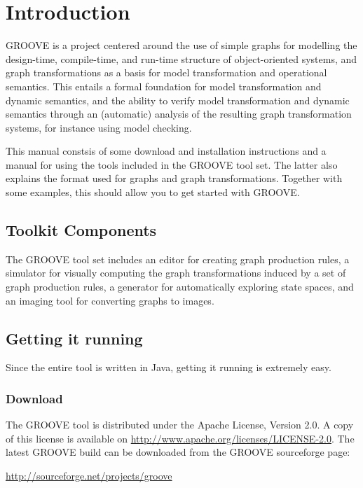 \section{Introduction}

GROOVE is a project centered around the use of simple graphs for
modelling the design-time, compile-time, and run-time structure of
object-oriented systems, and graph transformations as a basis for
model transformation and operational semantics. This entails a formal
foundation for  model transformation and dynamic semantics, and the
ability to verify model transformation and dynamic semantics through
an (automatic) analysis of the resulting graph transformation systems,
for instance using model checking.

This manual constsis of some download and installation instructions and a
manual for using the tools included in the GROOVE tool set. The latter also
explains the format used for graphs and graph transformations. Together
with some examples, this should allow you to get started with GROOVE.

\subsection{Toolkit Components}

The GROOVE tool set includes an editor for creating graph production
rules, a simulator for visually computing the graph transformations
induced by a set of graph production rules, a generator for
automatically exploring state spaces, and an imaging tool for
converting graphs to images.

\subsection{Getting it running}

Since the entire \Groove{} tool is written in Java, getting it running is
extremely easy.

\subsubsection{Download}

The GROOVE tool is distributed under the Apache License, Version 2.0. A copy of
this license is available on \url{http://www.apache.org/licenses/LICENSE-2.0}.
The latest GROOVE build can be downloaded from the GROOVE sourceforge page:

\begin{center}
\url{http://sourceforge.net/projects/groove}
\end{center}

